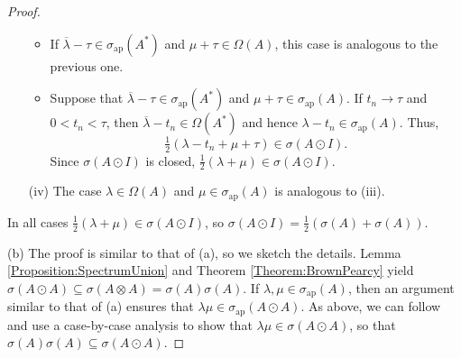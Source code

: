 \documentclass[10pt,reqno]{amsart}
\newcommand{\0}{{\color{lightgray}0}}
\theoremstyle{definition}
\numberwithin{equation}{section}
\begin{document}
\begin{proof}
\begin{itemize}
\begin{itemize}
                \item If $\overline{\lambda}-\tau \in \sigma_{\textrm{ap}}(A^*)$ and $\mu+\tau  \in \Omega(A)$, this case is
                analogous to the previous one.

                \item Suppose that $\overline{\lambda}-\tau \in \sigma_{\textrm{ap}}(A^*)$ and $\mu+\tau  \in \sigma_{\textrm{ap}}(A)$.
                	 If $t_n \to \tau $ and $0 <t_n <\tau $, then $\overline{\lambda}-t_n \in \Omega(A^*)$ 
            	 and hence $\lambda-t_n \in \sigma_{\textrm{ap}}(A)$. Thus, 
            	 \begin{equation*}
                    	 \tfrac{1}{2}(\lambda-t_n+\mu+\tau )\in \sigma(A\odot I).
            	 \end{equation*}
                Since $\sigma(A \odot I)$ is closed, $\frac{1}{2}(\lambda+\mu) \in \sigma(A\odot I)$. 
                \end{itemize}

    \item[(iv)] The case $\lambda \in \Omega(A)$ and $\mu\in \sigma_{\textrm{ap}}(A)$ is analogous to (iii).
\end{itemize}
    In all cases
    $\frac{1}{2}(\lambda+\mu)\in \sigma(A \odot I)$,
so $\sigma(A\odot I)=\frac{1}{2}(\sigma(A)+\sigma(A))$.

\medskip\noindent(b) The proof is similar to that of (a), so we sketch the details.  
Lemma \ref{Proposition:SpectrumUnion} and Theorem \ref{Theorem:BrownPearcy} yield
$\sigma( A \odot A ) \subseteq \sigma \left( A \otimes A \right) =  \sigma(A) \sigma(A)$.
If $\lambda,\mu \in \sigma_{\textrm{ap}}(A)$, then an argument similar to that of (a) ensures that
$\lambda \mu \in \sigma_{\textrm{ap}}(A\odot A)$.  As above, we can follow \cite[Proof 2]{Brown&Pearcy}
and use a case-by-case analysis to show that $\lambda \mu\in \sigma(A \odot A)$, so that
$\sigma(A)\sigma(A) \subseteq \sigma(A \odot A)$.
\end{proof}


\end{document}
